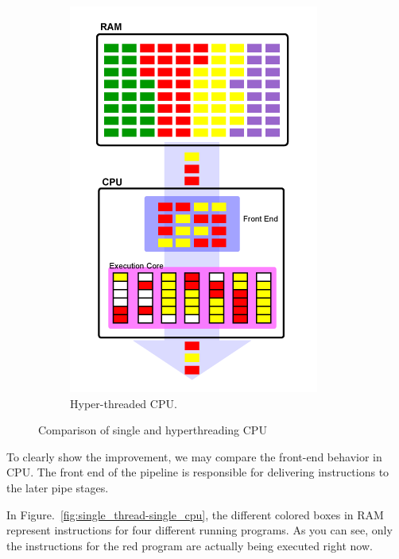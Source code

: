 \documentclass[doc,natbib,12pt]{apa6}
\begin{document}
\begin{figure} [htpb]
\begin{subfigure}{.45\textwidth}
			\includegraphics[width=1\linewidth]{hyperthread-single_cpu.png}
			\caption{Hyper-threaded CPU. \citep{Stokes2002}}
			\label{fig:hyperthread-single_cpu}
		\end{subfigure}
		\caption{Comparison of single and hyperthreading CPU}
		\label{fig:test}
	\end{figure}
	
	To clearly show the improvement, we may compare the front-end behavior in CPU. The front end of the pipeline is responsible for delivering instructions to the later pipe stages.
	
	In Figure.~\vref{fig:single_thread-single_cpu}, the different colored boxes in RAM represent instructions for four different running programs. As you can see, only the instructions for the red program are actually being executed right now. \citep{Stokes2002} 
	
\end{document}
